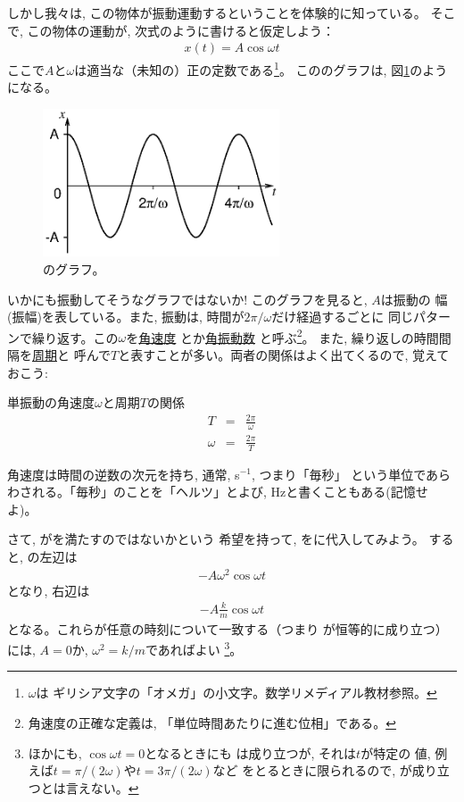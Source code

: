 しかし我々は, この物体が振動運動するということを体験的に知っている。
そこで, この物体の運動が, 次式のように書けると仮定しよう：
\begin{eqnarray}
x(t)=A\cos\omega t\label{eq:spring_Acos}
\end{eqnarray}
ここで$A$と$\omega$は適当な（未知の）正の定数である\footnote{$\omega$は
ギリシア文字の「オメガ」の小文字。数学リメディアル教材参照。}。
こののグラフは, 図\ref{fig:springAcos}のようになる。
\begin{figure}[h]
    \centering
    \includegraphics[width=7.0cm]{springAcos.eps}
    \caption{のグラフ。}\label{fig:springAcos}
\end{figure}
いかにも振動してそうなグラフではないか! このグラフを見ると, $A$は振動の
幅(振幅)を表している。また, 振動は, 時間が$2\pi/\omega$だけ経過するごとに
同じパターンで繰り返す。この$\omega$を\underline{角速度}
とか\underline{角振動数}
と呼ぶ\footnote{角速度の正確な定義は, 「単位時間あたりに進む位相」である。}。
また, 繰り返しの時間間隔を\underline{周期}と
呼んで$T$と表すことが多い。両者の関係はよく出てくるので, 
覚えておこう: 
\begin{itembox}{単振動の角速度$\omega$と周期$T$の関係}
\begin{eqnarray}
T&=&\frac{2\pi}{\omega}\label{eq:vib_period}\\
\omega&=&\frac{2\pi}{T}
\end{eqnarray}
\end{itembox}

角速度は時間の逆数の次元を持ち, 通常, s$^{-1}$, つまり「毎秒」
という単位であらわされる。「毎秒」のことを「ヘルツ」とよび, Hzと書くこともある(記憶せよ)。

さて, がを満たすのではないかという
希望を持って, をに代入してみよう。
すると, の左辺は
\begin{eqnarray}-A\omega^2\cos\omega t\end{eqnarray}
となり, 右辺は
\begin{eqnarray}-A\frac{k}{m}\cos\omega t\end{eqnarray}
となる。これらが任意の時刻について一致する（つまり
が恒等的に成り立つ）には, $A=0$か, $\omega^2=k/m$であればよい
\footnote{ほかにも, $\cos\omega t=0$となるときにも
は成り立つが, それは$t$が特定の
値, 例えば$t=\pi/(2\omega)$や$t=3\pi/(2\omega)$など
をとるときに限られるので, 
が成り立つとは言えない。}。

